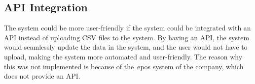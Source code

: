 \subsection{API Integration}\label{subsec:api-integration}

The system could be more user-friendly if the system could be integrated with an API instead of uploading CSV files
to the system.
By having an API, the system would seamlessly update the data in the system, and the user would not have to upload,
making the system more automated and user-friendly.
The reason why this was not implemented is because of the~\acrshort{epos} system of the company, which does not provide
an API\@.
